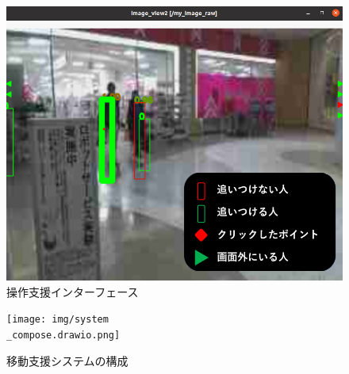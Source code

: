 \documentclass{kuisthesis}
\begin{document}
\begin{figure}[htbp]
  
  \includegraphics[width=15cm]{img/interface.png}
  \caption{操作支援インターフェース}
  \label{pic:interface}
\end{figure}
\begin{figure}[h]
  
  \texttt{[image: img/system\\\_compose.drawio.png]}
  \caption{移動支援システムの構成}
  \label{pic:systemcompose}

\end{figure}
\end{document}
